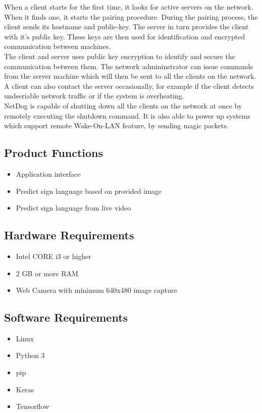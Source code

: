 When a client starts for the first time, it looks for active servers on the
network. When it finds one, it starts the pairing procedure. During the pairing
process, the client sends its hostname and public-key. The server in turn
provides the client with it's public key. These keys are then used for
identification and encrypted communication between machines.\\

The client and server uses public key encryption to identify and secure the
communication between them. The network admininstrator can issue commands from
the server machine which will then be sent to all the clients on the network.
A client can also contact the server occasionally, for example if the client
detects undseriable network traffic or if the system is overheating.\\

NetDog is capable of shutting down all the clients on the network at once by
remotely executing the shutdown command. It is also able to power up systems
which support remote Wake-On-LAN feature, by sending magic packets.\\

\subsection{Product Functions}
\begin{itemize}
    \item Application interface
    \item Predict sign language based on provided image 
    \item Predict sign language from live video 

\end{itemize}

\subsection{Hardware Requirements}
\begin{itemize}
    \item Intel CORE i3 or higher 
    \item 2 GB or more RAM
    \item Web Camera with minimum 640x480 image capture
\end{itemize}

\subsection{Software Requirements}
\begin{itemize}
    \item Linux
    \item Python 3
    \item pip
    \item Keras
    \item Tensorflow
\end{itemize}

